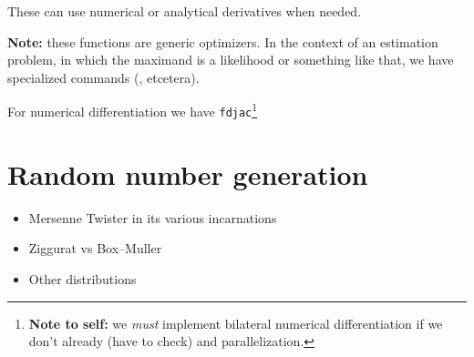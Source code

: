 These can use numerical or analytical derivatives when needed.

\textbf{Note:} these functions are generic optimizers. In the context
of an estimation problem, in which the maximand is a likelihood or
something like that, we have specialized commands (,
 etcetera).

For numerical differentiation we have
\texttt{fdjac}\footnote{\textbf{Note to self:} we \emph{must}
  implement bilateral numerical differentiation if we don't already
  (have to check) and parallelization.}


\section{Random number generation}

\begin{itemize}
\item Mersenne Twister in its various incarnations
\item Ziggurat vs Box--Muller
\item Other distributions
\end{itemize}

